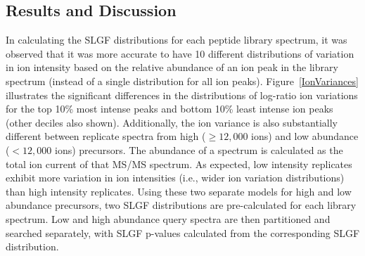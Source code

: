 \documentclass[endnotes,11pt]{article}
\begin{document}
\subsection*{Results and Discussion}

In calculating the SLGF distributions for each peptide library spectrum, it was observed that it was more accurate to have 10 different distributions of variation in ion intensity based on the relative abundance of an ion peak in the library spectrum (instead of a single distribution for all ion peaks). Figure~\ref{IonVariances} illustrates the significant differences in the distributions of log-ratio ion variations for the top 10\% most intense peaks and bottom 10\% least intense ion peaks (other deciles also shown). Additionally, the ion variance is also substantially different between replicate spectra from high ($\geq 12,000 $ ions) and low abundance ($<12,000 $ ions) precursors. The abundance of a spectrum is calculated as the total ion current of that MS/MS spectrum. As expected, low intensity replicates exhibit more variation in ion intensities (i.e., wider ion variation distributions) than high intensity replicates. Using these two separate models for high and low abundance precursors, two SLGF distributions are pre-calculated for each library spectrum. Low and high abundance query spectra are then partitioned and searched separately, with SLGF p-values calculated from the corresponding SLGF distribution.
\end{document}
